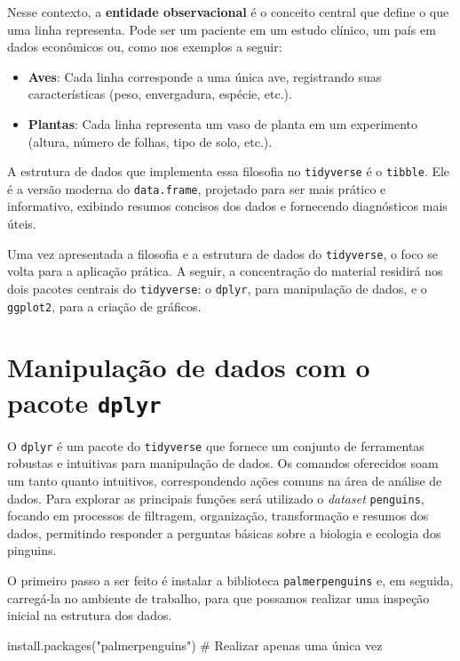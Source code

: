 \documentclass[
  12pt,
  letterpaper,
  DIV=11,
  numbers=noendperiod]{scrreprt}
\newenvironment{Shaded}{\begin{snugshade}}{\end{snugshade}}
\newcommand{\CommentTok}[1]{\textcolor[rgb]{0.37,0.37,0.37}{#1}}
\newcommand{\FunctionTok}[1]{\textcolor[rgb]{0.28,0.35,0.67}{#1}}
\newcommand{\NormalTok}[1]{\textcolor[rgb]{0.00,0.23,0.31}{#1}}
\newcommand{\StringTok}[1]{\textcolor[rgb]{0.13,0.47,0.30}{#1}}
\providecommand{\tightlist}{%
  \setlength{\itemsep}{0pt}\setlength{\parskip}{0pt}}\usepackage{longtable,booktabs,array}
\theoremstyle{definition}
\theoremstyle{exemplo}
\begin{document}
Nesse contexto, a \textbf{entidade observacional} é o conceito central
que define o que uma linha representa. Pode ser um paciente em um estudo
clínico, um país em dados econômicos ou, como nos exemplos a seguir:

\begin{itemize}
\tightlist
\item
  \textbf{Aves}: Cada linha corresponde a uma única ave, registrando
  suas características (peso, envergadura, espécie, etc.).
\item
  \textbf{Plantas}: Cada linha representa um vaso de planta em um
  experimento (altura, número de folhas, tipo de solo, etc.).
\end{itemize}

A estrutura de dados que implementa essa filosofia no \texttt{tidyverse}
é o \texttt{tibble}. Ele é a versão moderna do \texttt{data.frame},
projetado para ser mais prático e informativo, exibindo resumos concisos
dos dados e fornecendo diagnósticos mais úteis.

Uma vez apresentada a filosofia e a estrutura de dados do
\texttt{tidyverse}, o foco se volta para a aplicação prática. A seguir,
a concentração do material residirá nos dois pacotes centrais do
\texttt{tidyverse}: o \texttt{dplyr}, para manipulação de dados, e o
\texttt{ggplot2}, para a criação de gráficos.

\section{\texorpdfstring{Manipulação de dados com o pacote
\texttt{dplyr}}{Manipulação de dados com o pacote dplyr}}\label{manipulauxe7uxe3o-de-dados-com-o-pacote-dplyr}

O \texttt{dplyr} é um pacote do \texttt{tidyverse} que fornece um
conjunto de ferramentas robustas e intuitivas para manipulação de dados.
Os comandos oferecidos soam um tanto quanto intuitivos, correspondendo
ações comuns na área de análise de dados. Para explorar as principais
funções será utilizado o \emph{dataset} \texttt{penguins}, focando em
processos de filtragem, organização, transformação e resumos dos dados,
permitindo responder a perguntas básicas sobre a biologia e ecologia dos
pinguins.

O primeiro passo a ser feito é instalar a biblioteca
\texttt{palmerpenguins} e, em seguida, carregá-la no ambiente de
trabalho, para que possamos realizar uma inspeção inicial na estrutura
dos dados.

\begin{Shaded}
\begin{Highlighting}[]
\FunctionTok{install.packages}\NormalTok{(}\StringTok{"palmerpenguins"}\NormalTok{) }\CommentTok{\# Realizar apenas uma única vez}
\end{Highlighting}
\end{Shaded}
\end{document}
